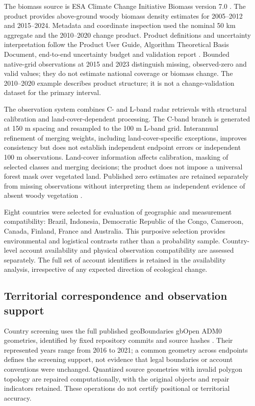 \documentclass[11pt,a4paper]{article}
\begin{document}
The biomass source is ESA Climate Change Initiative Biomass version 7.0 \citep{SantoroCartus2026}. The product provides above-ground woody biomass density estimates for 2005--2012 and 2015--2024. Metadata and coordinate inspection used the nominal 50 km aggregate and the 2010--2020 change product. Product definitions and uncertainty interpretation follow the Product User Guide, Algorithm Theoretical Basis Document, end-to-end uncertainty budget and validation report \citep{PUG2026,ATBD2025,E3UB2025,PVIR2026}. Bounded native-grid observations at 2015 and 2023 distinguish missing, observed-zero and valid values; they do not estimate national coverage or biomass change. The 2010--2020 example describes product structure; it is not a change-validation dataset for the primary interval.

The observation system combines C- and L-band radar retrievals with structural calibration and land-cover-dependent processing. The C-band branch is generated at 150 m spacing and resampled to the 100 m L-band grid. Interannual refinement of merging weights, including land-cover-specific exceptions, improves consistency but does not establish independent endpoint errors or independent 100 m observations. Land-cover information affects calibration, masking of selected classes and merging decisions; the product does not impose a universal forest mask over vegetated land. Published zero estimates are retained separately from missing observations without interpreting them as independent evidence of absent woody vegetation \citep[pp.~57--59, 82--83, 87, 91, 95, 101--102]{ATBD2025}.

Eight countries were selected for evaluation of geographic and measurement compatibility: Brazil, Indonesia, Democratic Republic of the Congo, Cameroon, Canada, Finland, France and Australia. This purposive selection provides environmental and logistical contrasts rather than a probability sample. Country-level account availability and physical observation compatibility are assessed separately. The full set of account identifiers is retained in the availability analysis, irrespective of any expected direction of ecological change.

\subsection{Territorial correspondence and observation support}
Country screening uses the full published geoBoundaries gbOpen ADM0 geometries, identified by fixed repository commits and source hashes \citep{Runfola2020}. Their represented years range from 2016 to 2021; a common geometry across endpoints defines the screening support, not evidence that legal boundaries or account conventions were unchanged. Quantized source geometries with invalid polygon topology are repaired computationally, with the original objects and repair indicators retained. These operations do not certify positional or territorial accuracy.
\end{document}
